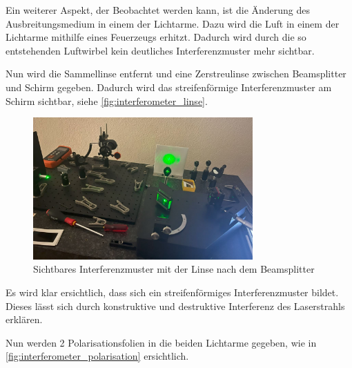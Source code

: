 \documentclass[12pt,english,ngerman]{scrartcl}
\begin{document}
Ein weiterer Aspekt, der Beobachtet werden kann, ist die Änderung des
Ausbreitungsmedium in einem der Lichtarme. Dazu wird die Luft in einem der
Lichtarme mithilfe eines Feuerzeugs erhitzt. Dadurch wird durch die so
entstehenden Luftwirbel kein deutliches Interferenzmuster mehr sichtbar.

Nun wird die Sammellinse entfernt und eine Zerstreulinse zwischen Beamsplitter
und Schirm gegeben. Dadurch wird das streifenförmige Interferenzmuster am
Schirm sichtbar, siehe \autoref{fig:interferometer_linse}.

\begin{figure}[H]
	\begin{center}
		\includegraphics[width =0.75\textwidth]{./figures/Interferometer_linse.JPG}
	\end{center}
	\caption[Sichtbares Interferenzmuster mit der Linse nach dem Beamsplitter] { Sichtbares
		Interferenzmuster mit der Linse nach dem Beamsplitter
	}\label{fig:interferometer_linse}
\end{figure}

Es wird klar ersichtlich, dass sich ein streifenförmiges Interferenzmuster
bildet. Dieses lässt sich durch konstruktive und destruktive Interferenz des
Laserstrahls erklären.

Nun werden 2 Polarisationsfolien in die beiden Lichtarme gegeben, wie in
\autoref{fig:interferometer_polarisation} ersichtlich.
\end{document}
